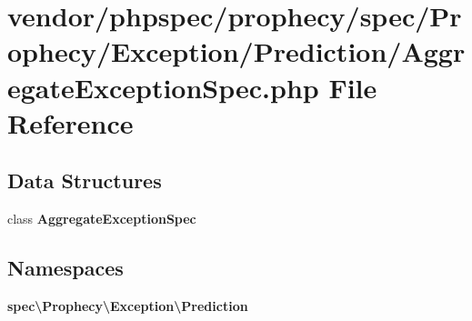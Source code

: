 \section{vendor/phpspec/prophecy/spec/\+Prophecy/\+Exception/\+Prediction/\+Aggregate\+Exception\+Spec.php File Reference}
\label{_aggregate_exception_spec_8php}
\subsection*{Data Structures}
\begin{DoxyCompactItemize}
\item 
class {\bf Aggregate\+Exception\+Spec}
\end{DoxyCompactItemize}
\subsection*{Namespaces}
\begin{DoxyCompactItemize}
\item 
 {\bf spec\textbackslash{}\+Prophecy\textbackslash{}\+Exception\textbackslash{}\+Prediction}
\end{DoxyCompactItemize}

